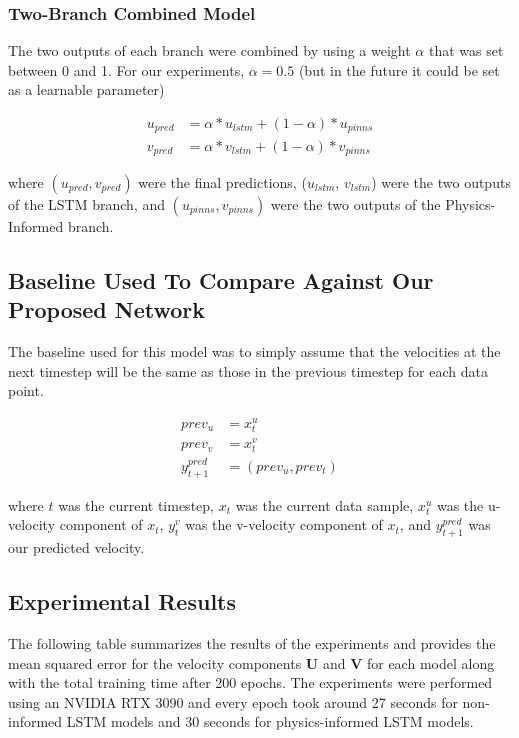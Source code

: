 \subsubsection{Two-Branch Combined Model}
The two outputs of each branch were combined by using a weight $\alpha$ that was set between 0 and 1. For our experiments, $\alpha = 0.5$ (but in the future it could be set as a learnable parameter)

\begin{equation}
\begin{split}
    u_{pred} &= \alpha * u_{lstm} + (1 - \alpha) * u_{pinns} \\
    v_{pred} &= \alpha * v_{lstm} + (1 - \alpha) * v_{pinns}
\end{split}
\end{equation}

where $(u_{pred}, v_{pred})$ were the final predictions, ($u_{lstm}$, $v_{lstm}$) were the two outputs of the LSTM branch, and $(u_{pinns}, v_{pinns})$ were the two outputs of the Physics-Informed branch.


\subsection{Baseline Used To Compare Against Our Proposed Network}
The baseline used for this model was to simply assume that the velocities at the next timestep will be the same as those in the previous timestep for each data point.

\begin{equation} \label{eq:no_change_baseline}
\begin{split}
    prev_u &= x_{t}^{u} \\
    prev_v &= x_{t}^{v} \\
    y_{t+1}^{pred} &= (prev_u, prev_t)
\end{split}
\end{equation}

where $t$ was the current timestep, $x_t$ was the current data sample, $x_t^u$ was the u-velocity component of $x_t$, $y_t^v$ was the v-velocity component of $x_t$, and $y_{t+1}^{pred}$ was our predicted velocity.

\subsection{Experimental Results}
The following table summarizes the results of the experiments and provides the mean squared error for the velocity components \textbf{U} and \textbf{V} for each model along with the total training time after 200 epochs. The experiments were performed using an NVIDIA RTX 3090 and every epoch took around 27 seconds for non-informed LSTM models and 30 seconds for physics-informed LSTM models.


